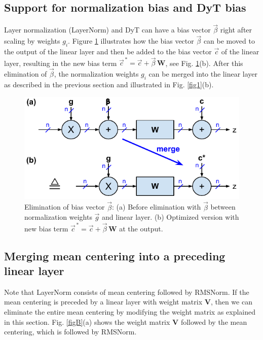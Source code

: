 \documentclass{article}
\newcommand{\mat}[1]{\mathbf{#1}}     %
\def\mW{\mat{W}}                      %
\def\mV{\mat{V}}                      %
\def\c{\vec{c}}                       %
\def\vb{\vec{\beta}}                  %
\def\vg{\vec{g}}                      %
\begin{document}
\subsection{Support for normalization bias and DyT bias}
Layer normalization (LayerNorm) \citep{layerNorm} and DyT \citep{DyT} can have a bias vector $\vb$ right after scaling by weights $g_i$. Figure \ref{figA} illustrates how the bias vector $\vb$ can be moved to the output of the linear layer and then be added to the bias vector $\c$ of the linear layer, resulting in the new bias term $\c^{\, \ast} = \c + \vb \, \mW$, see Fig. \ref{figA}(b). After this elimination of $\vb$, the normalization weights $g_i$ can be merged into the linear layer as described in the previous section and illustrated in Fig. \ref{fig1}(b).

\begin{figure}[h!] \centering  %
  \includegraphics[scale=0.9]{../doc/fig/flashNorm_figA.pdf}
  \caption{Elimination of bias vector $\vb$: (a) Before elimination with $\vb$ between normalization weights $\vg$ and linear layer. (b) Optimized version with new bias term  $\c^{\, \ast} = \c + \vb \, \mW$ at the output.}
\label{figA} \end{figure}

\subsection{Merging mean centering into a preceding linear layer}
Note that LayerNorm consists of mean centering followed by RMSNorm. If the mean centering is preceded by a linear layer with weight matrix $\mV$, then we can eliminate the entire mean centering by modifying the weight matrix as explained in this section. Fig. \ref{figB}(a) shows the weight matrix $\mV$ followed by the mean centering, which is followed by RMSNorm.
\end{document}
